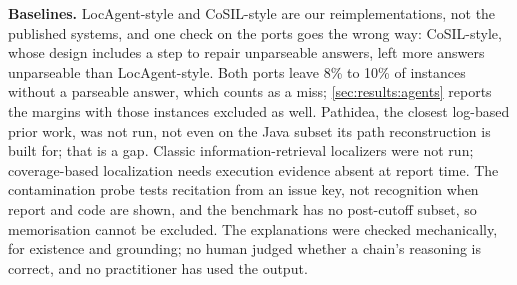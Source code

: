 \textbf{Baselines.} LocAgent-style and CoSIL-style are our
reimplementations, not the published systems, and one check on the
ports goes the wrong way: CoSIL-style, whose design includes a step to
repair unparseable answers, left more answers unparseable than
LocAgent-style. Both ports leave 8\% to 10\% of instances without a
parseable answer, which counts as a miss; \cref{sec:results:agents}
reports the margins with those instances excluded as well. Pathidea,
the closest log-based prior work, was not run, not even on the Java
subset its path reconstruction is built for; that is a gap. Classic information-retrieval
localizers were not run; coverage-based localization needs execution
evidence absent at report time. The contamination probe
tests recitation from an issue key, not recognition when report and
code are shown, and the benchmark has no post-cutoff subset, so
memorisation cannot be excluded. The explanations were checked mechanically, for existence
and grounding; no human judged whether a chain's reasoning is correct,
and no practitioner has used the output.
